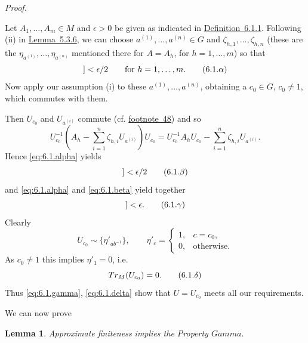\documentclass[b5paper,twoside]{article}
\newcommand{\lemref}[2]{\hyperref[#1]{\mbox{Lemma~#2}}}
\newcommand{\defref}[2]{\hyperref[#1]{\mbox{Definition~#2}}}
\theoremstyle{mvnplain}
\newtheorem{lemma}{Lemma}[section]
\renewenvironment{proof}[1][Proof]{%
  \par\addvspace{0.35\baselineskip}%
  \noindent\textit{#1.}\ \normalfont\ignorespaces
}{%
  \par\addvspace{0.35\baselineskip}%
}
\newcommand{\M}{\mathbf M}
\newcommand{\Metric}[1]{\left[\!\left[#1\right]\!\right]}
\def\M{M}%
\def\Metric#1{[[#1]]}%
\def\Gamma{Gamma}%
\def\operatorname#1{#1}%
\def\mathfrak#1{#1}%
\begin{document}
\begin{proof}
Let $A_1,\ldots,A_m\in\M$ and $\epsilon>0$ be given as indicated in
\defref{def:6.1.1}{6.1.1}. Following (ii) in \lemref{lem:5.3.6}{5.3.6}, we
can choose $a^{(1)},\ldots,a^{(n)}\in\mathfrak G$ and
$\zeta_{h,1},\ldots,\zeta_{h,n}$ (these are the
$\eta_{a^{(1)}},\ldots,\eta_{a^{(n)}}$ mentioned there for $A=A_h$, for
$h=1,\ldots,m$) so that
\begin{equation}
  \Metric{A_h-\sum_{i=1}^{n}\zeta_{h,i}U_{a^{(i)}}}<\epsilon/2
  \qquad\text{for }h=1,\ldots,m.
  \tag{6.1.\ensuremath{\alpha}}\label{eq:6.1.alpha}
\end{equation}
Now apply our assumption (i) to these $a^{(1)},\ldots,a^{(n)}$, obtaining a
$c_0\in\mathfrak G$, $c_0\ne1$, which commutes with them.

Then $U_{c_0}$ and $U_{a^{(i)}}$ commute
(cf. \hyperlink{fn:48}{footnote~48}) and so
\[
  U_{c_0}^{-1}\left(A_h-\sum_{i=1}^{n}\zeta_{h,i}U_{a^{(i)}}\right)U_{c_0}
  =U_{c_0}^{-1}A_hU_{c_0}-\sum_{i=1}^{n}\zeta_{h,i}U_{a^{(i)}}.
\]
Hence \eqref{eq:6.1.alpha} yields
\begin{equation}
  \Metric{U_{c_0}^{-1}A_hU_{c_0}
  -\sum_{i=1}^{n}\zeta_{h,i}U_{a^{(i)}}}<\epsilon/2
  \tag{6.1.\ensuremath{\beta}}\label{eq:6.1.beta}
\end{equation}
and \eqref{eq:6.1.alpha} and \eqref{eq:6.1.beta} yield together
\begin{equation}
  \Metric{U_{c_0}^{-1}A_hU_{c_0}-A_h}<\epsilon.
  \tag{6.1.\ensuremath{\gamma}}\label{eq:6.1.gamma}
\end{equation}
Clearly
\[
  U_{c_0}\sim\{\eta'_{ab^{-1}}\},
  \qquad
  \eta'_c=
  \begin{cases}
    1,&c=c_0,\\
    0,&\text{otherwise}.
  \end{cases}
\]
As $c_0\ne1$ this implies $\eta'_1=0$, i.e.
\begin{equation}
  \operatorname{Tr}_{\M}(U_{c_0})=0.
  \tag{6.1.\ensuremath{\delta}}\label{eq:6.1.delta}
\end{equation}
Thus \eqref{eq:6.1.gamma}, \eqref{eq:6.1.delta} show that $U=U_{c_0}$ meets
all our requirements.
\end{proof}

We can now prove
\begin{lemma}\label{lem:6.1.2}
Approximate finiteness implies the Property $\Gamma$.
\end{lemma}
\end{document}

